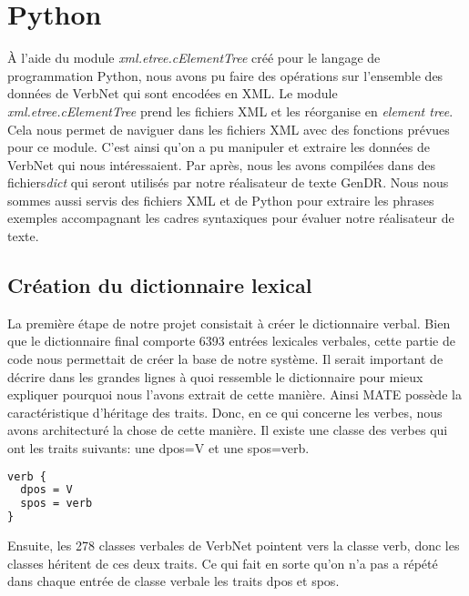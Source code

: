 \chapter{Python}


À l'aide du module \emph{xml.etree.cElementTree} créé pour le langage de programmation Python, nous avons pu faire des opérations sur l'ensemble des données de VerbNet qui sont encodées en XML. Le module \emph{xml.etree.cElementTree} prend les fichiers XML et les réorganise en \emph{element tree}. Cela nous permet de naviguer dans les fichiers XML avec des fonctions prévues pour ce module. C'est ainsi qu'on a pu manipuler et extraire les données de VerbNet qui nous intéressaient. Par après, nous les avons compilées dans des fichiers\emph{dict} qui seront utilisés par notre réalisateur de texte GenDR. Nous nous sommes aussi servis des fichiers XML et de Python pour extraire les phrases exemples accompagnant les cadres syntaxiques pour évaluer notre réalisateur de texte.

\section{Création du dictionnaire lexical}

La première étape de notre projet consistait à créer le dictionnaire verbal. Bien que le dictionnaire final comporte 6393 entrées lexicales verbales, cette partie de code nous permettait de créer la base de notre système. Il serait important de décrire dans les grandes lignes à quoi ressemble le dictionnaire pour mieux expliquer pourquoi nous l'avons extrait de cette manière. Ainsi MATE possède la caractéristique d'héritage des traits. Donc, en ce qui concerne les verbes, nous avons architecturé la chose de cette manière. Il existe une classe des verbes qui ont les traits suivants: une dpos=V et une spos=verb.

\begin{lstlisting}[language=XML]
verb {
  dpos = V
  spos = verb
}
\end{lstlisting}

Ensuite, les 278 classes verbales de VerbNet pointent vers la classe verb, donc les classes héritent de ces deux traits. Ce qui fait en sorte qu'on n'a pas a répété dans chaque entrée de classe verbale les traits dpos et spos. 

